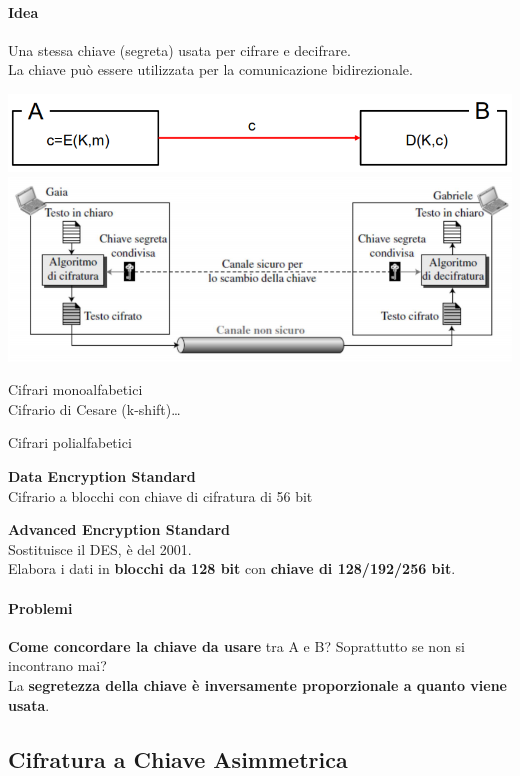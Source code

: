 \documentclass[10pt]{article}
\begin{document}
{\paragraph{Idea} Una stessa chiave (segreta) usata per cifrare e decifrare.\\
La chiave può essere utilizzata per la comunicazione bidirezionale.
\begin{center}
\includegraphics[scale=0.8]{cifrchiavesimm.png}\\
\includegraphics[scale=0.75]{cifrchiavesimm2.png}
\end{center}
\begin{list}{}{}
	\item Cifrari monoalfabetici\\
	Cifrario di Cesare (k-shift)\ldots
	\item Cifrari polialfabetici
	\item \textbf{Data Encryption Standard}\\
	Cifrario a blocchi con chiave di cifratura di 56 bit
	\item \textbf{Advanced Encryption Standard}\\
	Sostituisce il DES, è del 2001.\\
	Elabora i dati in \textbf{blocchi da 128 bit} con \textbf{chiave di 128/192/256 bit}.
\end{list}
\pagebreak
\paragraph{Problemi} \textbf{Come concordare la chiave da usare} tra A e B? Soprattutto se non si incontrano mai?\\
La \textbf{segretezza della chiave è inversamente proporzionale a quanto viene usata}.
\subsection{Cifratura a Chiave Asimmetrica}
}
\end{document}
